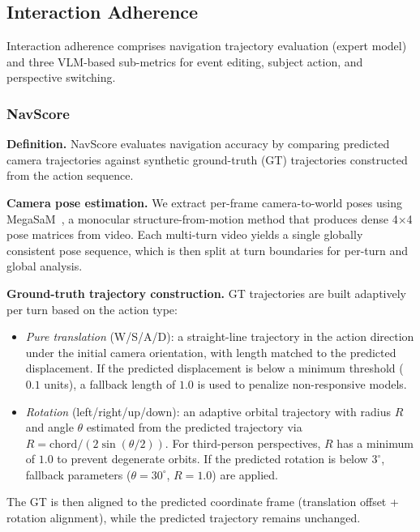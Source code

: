 \documentclass{llmxive}
\providecommand{\myparagraph}[1]{\vspace{-0.1em}\noindent\textbf{#1}\hspace{0.3em}}
\begin{document}
\subsection{Interaction Adherence}
\label{app:interaction_detail}

Interaction adherence comprises navigation trajectory evaluation (expert model) and three VLM-based sub-metrics for event editing, subject action, and perspective switching.

\subsubsection{NavScore}
\label{app:nav_detail}

\myparagraph{Definition.}
NavScore evaluates navigation accuracy by comparing predicted camera trajectories against synthetic ground-truth (GT) trajectories constructed from the action sequence.

\myparagraph{Camera pose estimation.}
We extract per-frame camera-to-world poses using MegaSaM~\cite{li2024megasam}, a monocular structure-from-motion method that produces dense 4$\times$4 pose matrices from video.
Each multi-turn video yields a single globally consistent pose sequence, which is then split at turn boundaries for per-turn and global analysis.

\myparagraph{Ground-truth trajectory construction.}
GT trajectories are built adaptively per turn based on the action type:
\begin{itemize}[leftmargin=1.5em, nosep]
  \item \emph{Pure translation} (W/S/A/D): a straight-line trajectory in the action direction under the initial camera orientation, with length matched to the predicted displacement. If the predicted displacement is below a minimum threshold ($0.1$ units), a fallback length of $1.0$ is used to penalize non-responsive models.
  \item \emph{Rotation} (left/right/up/down): an adaptive orbital trajectory with radius $R$ and angle $\theta$ estimated from the predicted trajectory via $R = \text{chord} / (2\sin(\theta/2))$. For third-person perspectives, $R$ has a minimum of $1.0$ to prevent degenerate orbits. If the predicted rotation is below $3^\circ$, fallback parameters ($\theta = 30^\circ$, $R = 1.0$) are applied.
\end{itemize}
The GT is then aligned to the predicted coordinate frame (translation offset + rotation alignment), while the predicted trajectory remains unchanged.
\end{document}
